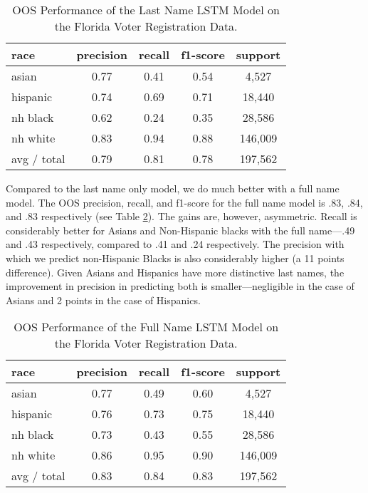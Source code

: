 \documentclass[12pt, letterpaper]{article}
\begin{document}
\begin{table}[h!]
\centering
\caption{OOS Performance of the Last Name LSTM Model on the Florida Voter Registration Data.}
\begin{tabular}{ l c c c c }
\hline    
    race & precision & recall & f1-score & support \\
\hline
      asian &        0.77 &       0.41 &       0.54 &       4,527\\
   hispanic &        0.74 &       0.69 &       0.71 &      18,440\\
   nh black &        0.62 &       0.24 &       0.35 &      28,586\\
   nh white &        0.83 &       0.94 &       0.88 &     146,009\\

avg / total &        0.79 &       0.81 &       0.78 &     197,562\\

\hline
\end{tabular}
\label{table:last_name_fl_voter_reg}
\end{table}

Compared to the last name only model, we do much better with a full name model. The OOS precision, recall, and f1-score for the full name model is .83, .84, and .83 respectively (see Table \ref{table:full_name_fl_voter_reg}). The gains are, however, asymmetric. Recall is considerably better for Asians and Non-Hispanic blacks with the full name---.49 and .43 respectively, compared to .41 and .24 respectively. The precision with which we predict non-Hispanic Blacks is also considerably higher (a 11 points difference). Given Asians and Hispanics have more distinctive last names, the improvement in precision in predicting both is smaller---negligible in the case of Asians and 2 points in the case of Hispanics.

\begin{table}[h!]
\centering
\caption{OOS Performance of the Full Name LSTM Model on the Florida Voter Registration Data.}
\begin{tabular}{ l c c c c }
\hline    
   race & precision & recall & f1-score & support\\
\hline
      asian &        0.77 &       0.49 &       0.60 &       4,527\\
   hispanic &        0.76 &       0.73 &       0.75 &      18,440\\
   nh black &        0.73 &       0.43 &       0.55 &      28,586\\
   nh white &        0.86 &       0.95 &       0.90 &     146,009\\

avg / total &        0.83 &       0.84 &       0.83 &     197,562\\
\hline
\end{tabular}
\label{table:full_name_fl_voter_reg}
\end{table}
\end{document}
